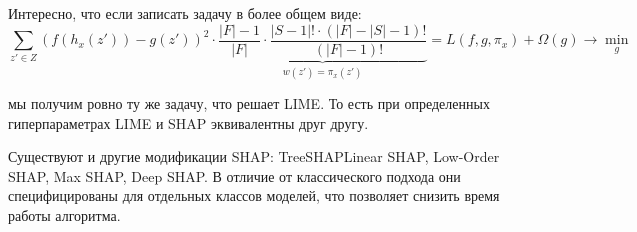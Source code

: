 Интересно, что если записать задачу в более общем виде:
\[
\sum\limits_{z' \in Z} (f(h_x(z')) - g(z'))^2 \cdot \underbrace{\frac{|F|-1}{|F|} \cdot \frac{|S - 1|! \cdot (|F|-|S|-1)!}{(|F|-1)!}}_{w(z') = \pi_x(z')} = L(f, g, \pi_x) + \Omega(g) \rightarrow \min_g
\]

мы получим ровно ту же задачу, что решает LIME. То есть при определенных гиперпараметрах LIME и SHAP эквивалентны друг другу.

Существуют и другие модификации SHAP: TreeSHAPLinear SHAP, Low-Order SHAP, Max SHAP, Deep SHAP. В отличие от классического подхода они специфицированы для отдельных классов моделей, что позволяет снизить время работы алгоритма.



